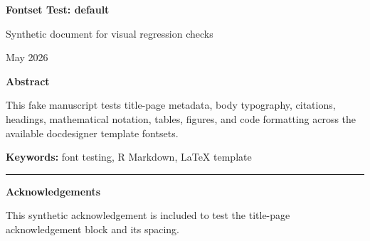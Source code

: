 \documentclass[12pt]{article}
\newif\ifdocdesigneranon
\begin{document}
\begin{titlepage}
\thispagestyle{empty}

\vspace*{0.14\textheight}
\begin{center}


{\LARGE\bfseries Fontset Test: default\par}

\vspace{0.25em}
{\large Synthetic document for visual regression checks\par}

\vspace{2em}

\begin{singlespace}
{\normalsize

\docdesignerauthorblock

\par\vspace{2\baselineskip}
\docdesignerseriesblock

\ifdocdesigneranon\else
\vspace{0.5em}
{\small May 2026}\par
\fi

}
\end{singlespace}


\vspace{2em}

\begin{minipage}{0.8\textwidth}
\small\singlespacing
\textbf{Abstract}\par\vspace{0.25em}
This fake manuscript tests title-page metadata, body typography,
citations, headings, mathematical notation, tables, figures, and code
formatting across the available docdesigner template fontsets.
\par\vspace{1em}
\noindent\textbf{Keywords: }font testing, R Markdown, LaTeX template
\end{minipage}

\vfill

\ifdocdesigneranon\else
\begin{minipage}{0.8\textwidth}
\footnotesize\singlespacing
\noindent\rule{0.3\textwidth}{0.4pt}\par
\textbf{Acknowledgements}\par
This synthetic acknowledgement is included to test the title-page
acknowledgement block and its spacing.
\end{minipage}
\fi

\end{center}
\end{titlepage}
\fi\fi
\fi\fi
\end{document}
